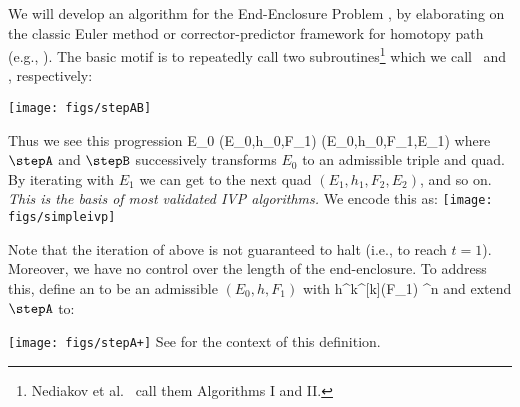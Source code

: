 	We will develop an algorithm for the End-Enclosure
	Problem , by elaborating
	on the classic Euler method or corrector-predictor
	framework for homotopy path 
	(e.g., \cite{sommese+2:intro-nag:10,xu-burr-yap:homotopy:18}).
	The basic motif is to 
	repeatedly call two subroutines\footnote{
		Nediakov et al.~\cite{nedialkov+2:validated-ode:99}
		call them Algorithms I and II.
	}
	which we call \stepA\ and \stepB, respectively:
	
			\texttt{[image: figs/stepAB]}
	\eeql
	
\DeclareRobustCommand{\loongrightarrow}{%
  	\DOTSB \relbar\joinrel \relbar\joinrel
  		\relbar\joinrel \relbar\joinrel
		\rightarrow }
\DeclareRobustCommand{\looongrightarrow}{%
  \DOTSB \relbar\joinrel \relbar\joinrel
  		 \relbar\joinrel \relbar\joinrel
  		 \relbar\joinrel \relbar\joinrel \rightarrow }
	
	Thus we see this progression
			E_0 \overset{\stepA}{\looongrightarrow}
			(E_0,h_0,F_1) \overset{\stepB}{\looongrightarrow}
			(E_0,h_0,F_1,E_1) 
		\eeql
	where $\stepA$ and $\stepB$ successively
	transforms $E_0$ to an admissible triple and quad.
	By iterating  with $E_1$ we can get to
	the next quad $(E_1, h_1, F_2,E_2)$, and so on.  {\em This is
	the basis of most validated IVP algorithms.}
	We encode this as:
			\texttt{[image: figs/simpleivp]}
		\eeql
	
	Note that the iteration of 
	above is not guaranteed to halt (i.e.,
	to reach $t=1$).  Moreover, we have no control over the length of
	the end-enclosure.
	To address this, define an 
	to be an admissible $(E_0,h,F_1)$ with 	
	h^k\bff^{[k]}(F_1) \ib[-\veps,\veps]^n
	\eeql
	and extend $\stepA$ to:

		\texttt{[image: figs/stepA+]}
	\eeql
	See  for the context of this definition.

